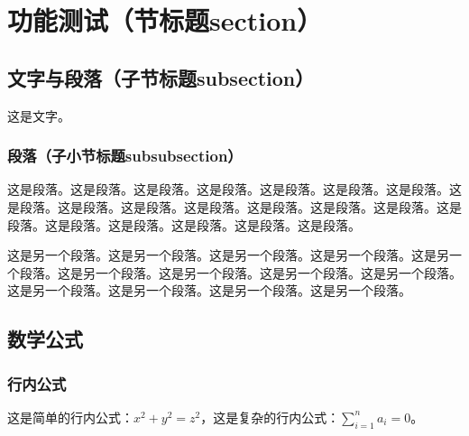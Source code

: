 \documentclass[UTF8, zihao = -4, linespread = 1.335, heading = true, fontset = none]{ctexart}
\begin{document}





\transbody
\pagestyle{ujntranslation}


\section{功能测试（节标题section）}
\subsection{文字与段落（子节标题subsection）}
这是文字。
\subsubsection{段落（子小节标题subsubsection）}
这是段落。这是段落。这是段落。这是段落。这是段落。这是段落。这是段落。这是段落。这是段落。这是段落。这是段落。这是段落。这是段落。这是段落。这是段落。这是段落。这是段落。这是段落。这是段落。这是段落。

这是另一个段落。这是另一个段落。这是另一个段落。这是另一个段落。这是另一个段落。这是另一个段落。这是另一个段落。这是另一个段落。这是另一个段落。这是另一个段落。这是另一个段落。这是另一个段落。这是另一个段落。
\subsection{数学公式}
\subsubsection{行内公式}
这是简单的行内公式：$x^2+y^2=z^2$，这是复杂的行内公式：$\sum_{i=1}^n a_i=0$。
\end{document}
